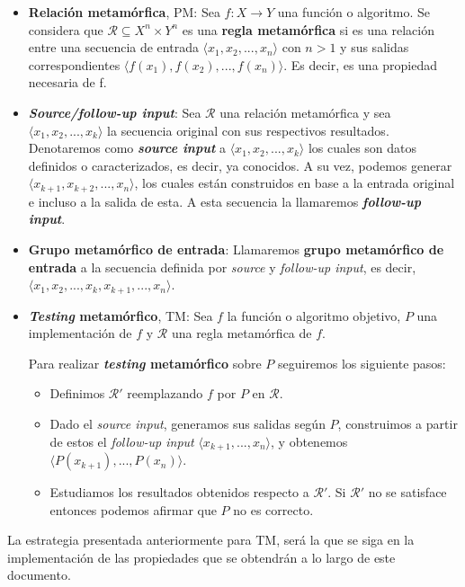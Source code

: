 \begin{itemize}
    \item \textbf{Relación metamórfica}, PM: Sea $f: X \rightarrow Y$ una función o algoritmo. Se considera que $\mathscr{R} \subseteq X^{n} \times Y^{n}$ es una \textbf{regla metamórfica} si es una relación entre una secuencia de entrada $\langle x_{1},x_{2},...,x_{n}\rangle$ con $n>1$ y sus salidas correspondientes $\langle f(x_{1}),f(x_{2}),...,f(x_{n})\rangle$. Es decir, es una propiedad necesaria de f.
    \item \textbf{\textit{Source/follow-up input}}: Sea $\mathscr{R}$ una relación metamórfica y sea $\langle x_{1},x_{2},...,x_{k}\rangle$ la secuencia original con sus respectivos resultados. Denotaremos como \textbf{\textit{source input}} a   $\langle x_{1},x_{2},...,x_{k}\rangle$  los cuales son datos definidos o caracterizados, es decir, ya conocidos. A su vez, podemos generar $\langle x_{k+1},x_{k+2},...,x_{n}\rangle$, los cuales están construidos en base a la entrada original e incluso a la salida de esta. A esta secuencia la llamaremos \textbf{\textit{follow-up input}}.
    \item \textbf{Grupo metamórfico de entrada}: Llamaremos \textbf{grupo metamórfico de entrada} a la secuencia definida por \textit{source} y \textit{follow-up input}, es decir, $\langle x_{1},x_{2},...,x_{k},x_{k+1},...,x_{n}\rangle$.
    \item \textbf{\textit{Testing} metamórfico}, TM: Sea $f$ la función o algoritmo objetivo, $P$ una implementación de $f$ y $\mathscr{R}$ una regla metamórfica de $f$.
    
    Para realizar \textbf{\textit{testing} metamórfico} sobre $P$ seguiremos los siguiente pasos:
    \begin{itemize}
        \item Definimos $\mathscr{R}'$ reemplazando $f$ por $P$ en $\mathscr{R}$.
        \item Dado el \textit{source input}, generamos sus salidas según $P$, construimos a partir de estos el \textit{follow-up input} $\langle x_{k+1},...,x_{n}\rangle$, y obtenemos $\langle P(x_{k+1}),...,P(x_{n})\rangle$.
        \item Estudiamos los resultados obtenidos respecto a $\mathscr{R}'$. Si $\mathscr{R}'$ no se satisface entonces podemos afirmar que $P$ no es correcto.
    \end{itemize}
\end{itemize}

La estrategia presentada anteriormente para TM, será la que se siga en la implementación de las propiedades que se obtendrán a lo largo de este documento. \newline

